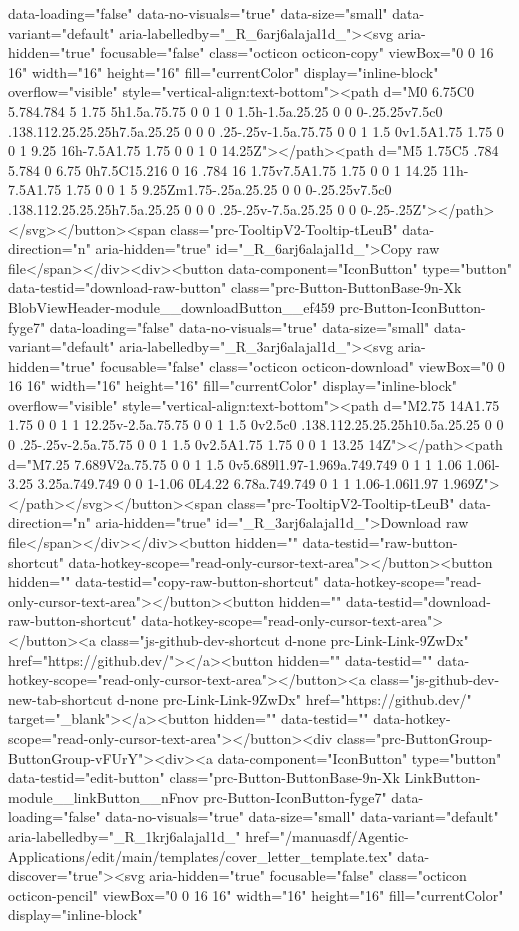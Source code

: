 {{{{{{{data-loading="false" data-no-visuals="true" data-size="small" data-variant="default" aria-labelledby="_R_6arj6alajal1d_"><svg aria-hidden="true" focusable="false" class="octicon octicon-copy" viewBox="0 0 16 16" width="16" height="16" fill="currentColor" display="inline-block" overflow="visible" style="vertical-align:text-bottom"><path d="M0 6.75C0 5.784.784 5 1.75 5h1.5a.75.75 0 0 1 0 1.5h-1.5a.25.25 0 0 0-.25.25v7.5c0 .138.112.25.25.25h7.5a.25.25 0 0 0 .25-.25v-1.5a.75.75 0 0 1 1.5 0v1.5A1.75 1.75 0 0 1 9.25 16h-7.5A1.75 1.75 0 0 1 0 14.25Z"></path><path d="M5 1.75C5 .784 5.784 0 6.75 0h7.5C15.216 0 16 .784 16 1.75v7.5A1.75 1.75 0 0 1 14.25 11h-7.5A1.75 1.75 0 0 1 5 9.25Zm1.75-.25a.25.25 0 0 0-.25.25v7.5c0 .138.112.25.25.25h7.5a.25.25 0 0 0 .25-.25v-7.5a.25.25 0 0 0-.25-.25Z"></path></svg></button><span class="prc-TooltipV2-Tooltip-tLeuB" data-direction="n" aria-hidden="true" id="_R_6arj6alajal1d_">Copy raw file</span></div><div><button data-component="IconButton" type="button" data-testid="download-raw-button" class="prc-Button-ButtonBase-9n-Xk BlobViewHeader-module__downloadButton__ef459 prc-Button-IconButton-fyge7" data-loading="false" data-no-visuals="true" data-size="small" data-variant="default" aria-labelledby="_R_3arj6alajal1d_"><svg aria-hidden="true" focusable="false" class="octicon octicon-download" viewBox="0 0 16 16" width="16" height="16" fill="currentColor" display="inline-block" overflow="visible" style="vertical-align:text-bottom"><path d="M2.75 14A1.75 1.75 0 0 1 1 12.25v-2.5a.75.75 0 0 1 1.5 0v2.5c0 .138.112.25.25.25h10.5a.25.25 0 0 0 .25-.25v-2.5a.75.75 0 0 1 1.5 0v2.5A1.75 1.75 0 0 1 13.25 14Z"></path><path d="M7.25 7.689V2a.75.75 0 0 1 1.5 0v5.689l1.97-1.969a.749.749 0 1 1 1.06 1.06l-3.25 3.25a.749.749 0 0 1-1.06 0L4.22 6.78a.749.749 0 1 1 1.06-1.06l1.97 1.969Z"></path></svg></button><span class="prc-TooltipV2-Tooltip-tLeuB" data-direction="n" aria-hidden="true" id="_R_3arj6alajal1d_">Download raw file</span></div></div><button hidden="" data-testid="raw-button-shortcut" data-hotkey-scope="read-only-cursor-text-area"></button><button hidden="" data-testid="copy-raw-button-shortcut" data-hotkey-scope="read-only-cursor-text-area"></button><button hidden="" data-testid="download-raw-button-shortcut" data-hotkey-scope="read-only-cursor-text-area"></button><a class="js-github-dev-shortcut d-none prc-Link-Link-9ZwDx" href="https://github.dev/"></a><button hidden="" data-testid="" data-hotkey-scope="read-only-cursor-text-area"></button><a class="js-github-dev-new-tab-shortcut d-none prc-Link-Link-9ZwDx" href="https://github.dev/" target="_blank"></a><button hidden="" data-testid="" data-hotkey-scope="read-only-cursor-text-area"></button><div class="prc-ButtonGroup-ButtonGroup-vFUrY"><div><a data-component="IconButton" type="button" data-testid="edit-button" class="prc-Button-ButtonBase-9n-Xk LinkButton-module__linkButton__nFnov prc-Button-IconButton-fyge7" data-loading="false" data-no-visuals="true" data-size="small" data-variant="default" aria-labelledby="_R_1krj6alajal1d_" href="/manuasdf/Agentic-Applications/edit/main/templates/cover_letter_template.tex" data-discover="true"><svg aria-hidden="true" focusable="false" class="octicon octicon-pencil" viewBox="0 0 16 16" width="16" height="16" fill="currentColor" display="inline-block" }}}}}}}
